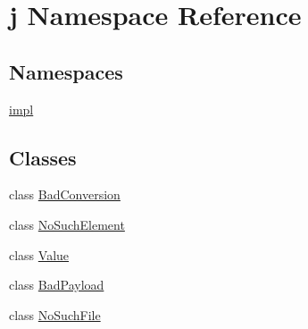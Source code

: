 \hypertarget{namespacej}{\section{j Namespace Reference}
\label{namespacej}
}
\subsection*{Namespaces}
\begin{DoxyCompactItemize}
\item 
\hyperlink{namespacej_1_1impl}{impl}
\end{DoxyCompactItemize}
\subsection*{Classes}
\begin{DoxyCompactItemize}
\item 
class \hyperlink{classj_1_1_bad_conversion}{Bad\-Conversion}
\item 
class \hyperlink{classj_1_1_no_such_element}{No\-Such\-Element}
\item 
class \hyperlink{classj_1_1_value}{Value}
\item 
class \hyperlink{classj_1_1_bad_payload}{Bad\-Payload}
\item 
class \hyperlink{classj_1_1_no_such_file}{No\-Such\-File}
\end{DoxyCompactItemize}
